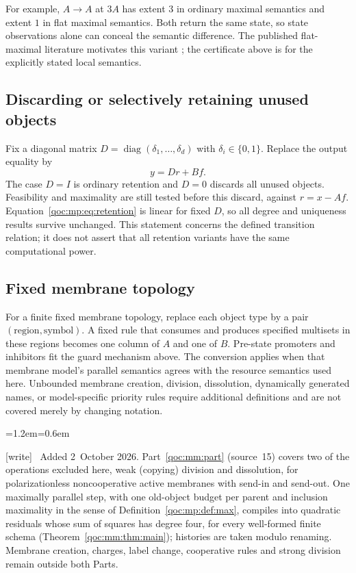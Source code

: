 \documentclass[11pt,letterpaper]{article}
\theoremstyle{definition}
\theoremstyle{remark}
\newcommand{\diag}{\operatorname{diag}}
\newcommand{\wtag}{\textup{[write]}}
\newenvironment{writenote}{\par\smallskip\begin{list}{}{\leftmargin=1.2em\rightmargin=0.6em}\item[]\small\wtag\ }{\end{list}\smallskip}
\begin{document}
For example, $A\to A$ at $3A$ has extent $3$ in ordinary maximal semantics
and extent $1$ in flat maximal semantics. Both return the same state, so
state observations alone can conceal the semantic difference. The
published flat-maximal literature motivates this variant \cite{mp:flat}; the
certificate above is for the explicitly stated local semantics.

\subsection{Discarding or selectively retaining unused objects}
Fix a diagonal matrix $D=\diag(\delta_1,\ldots,\delta_d)$ with
$\delta_i\in\{0,1\}$. Replace the output equality by
\begin{equation}\label{qoc:mp:eq:retention}
 y=Dr+Bf.
\end{equation}
The case $D=I$ is ordinary retention and $D=0$ discards all unused objects.
Feasibility and maximality are still tested before this discard, against
$r=x-Af$. Equation~\eqref{qoc:mp:eq:retention} is linear for fixed $D$, so all
degree and uniqueness results survive unchanged. This statement concerns
the defined transition relation; it does not assert that all retention
variants have the same computational power.

\subsection{Fixed membrane topology}
For a finite fixed membrane topology, replace each object type by a pair
$(\text{region},\text{symbol})$. A fixed rule that consumes and produces
specified multisets in these regions becomes one column of $A$ and one
of $B$. Pre-state promoters and inhibitors fit the guard mechanism above.
The conversion applies when that membrane model's parallel semantics agrees
with the resource semantics used here. Unbounded membrane creation,
division, dissolution, dynamically generated names, or model-specific
priority rules require additional definitions and are not covered merely
by changing notation.
\begin{writenote}
Added 2~October 2026. Part~\ref{qoc:mm:part} (source~15) covers two of the operations excluded here, weak (copying) division and dissolution, for polarizationless noncooperative active membranes with send-in and send-out. One maximally parallel step, with one old-object budget per parent and inclusion maximality in the sense of Definition~\ref{qoc:mp:def:max}, compiles into quadratic residuals whose sum of squares has degree four, for every well-formed finite schema (Theorem~\ref{qoc:mm:thm:main}); histories are taken modulo renaming. Membrane creation, charges, label change, cooperative rules and strong division remain outside both Parts.
\end{writenote}
\end{document}
